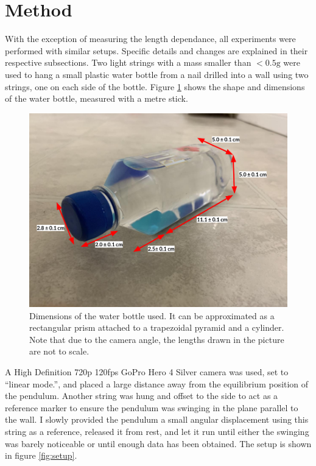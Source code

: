 \documentclass[%
 reprint,
 amsmath,amssymb
 aps,
]{revtex4-2}
\begin{document}
\section{Method}
With the exception of measuring the length dependance, all experiments were performed with similar setups. Specific details and changes are explained in their respective subsections. Two light strings with a mass smaller than $ <0.5\si{\gram}$ were used to hang a small plastic water bottle from a nail drilled into a wall using two strings, one on each side of the bottle. Figure \ref{fig:bottle} shows the shape and dimensions of the water bottle, measured with a metre stick.
\begin{figure}[!h]
    \includegraphics[width=\linewidth]{figures/bottle.png}
    \caption{Dimensions of the water bottle used. It can be approximated as a rectangular prism attached to a trapezoidal pyramid and a cylinder. Note that due to the camera angle, the lengths drawn in the picture are not to scale.}
    \label{fig:bottle}
\end{figure}
A High Definition 720p 120fps GoPro Hero 4 Silver camera was used, set to ``linear mode.'', and placed a large distance away from the equilibrium position of the pendulum. Another string was hung and offset to the side to act as a reference marker to ensure the pendulum was swinging in the plane parallel to the wall. I slowly provided the pendulum a small angular displacement using this string as a reference, released it from rest, and let it run until either the swinging was barely noticeable or until enough data has been obtained. The setup is shown in figure \ref{fig:setup}.
\end{document}
